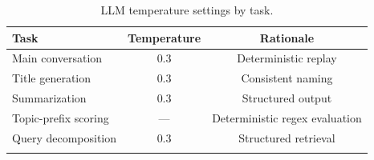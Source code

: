 \documentclass[pdflatex,sn-mathphys-num]{sn-jnl}%
\theoremstyle{thmstyleone}%
\theoremstyle{thmstyletwo}%
\theoremstyle{thmstylethree}%
\begin{document}

\begin{table}[htbp]
\caption{LLM temperature settings by task.}\label{tab:temps}
\begin{tabular*}{\textwidth}{@{\extracolsep\fill}lcc@{}}
\toprule
\textbf{Task} & \textbf{Temperature} & \textbf{Rationale} \\
\midrule
Main conversation  & 0.3 & Deterministic replay \\
Title generation   & 0.3 & Consistent naming \\
Summarization      & 0.3 & Structured output \\
Topic-prefix scoring & --- & Deterministic regex evaluation \\
Query decomposition & 0.3 & Structured retrieval \\
\botrule
\end{tabular*}
\end{table}


\end{document}
